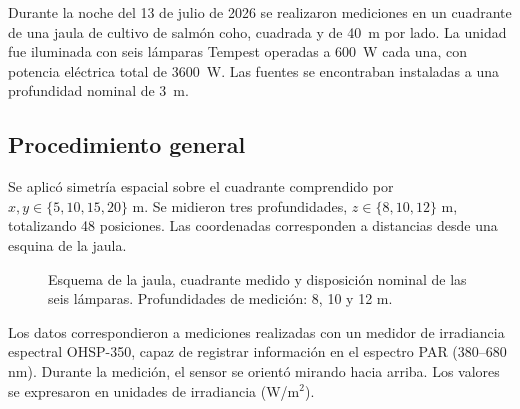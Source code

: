 \documentclass[11pt,letterpaper]{article}
\begin{document}
Durante la noche del 13 de julio de 2026 se realizaron mediciones en un cuadrante de una jaula de cultivo de salmón coho, cuadrada y de \SI{40}{\metre} por lado. La unidad fue iluminada con seis lámparas Tempest operadas a \SI{600}{\watt} cada una, con potencia eléctrica total de \SI{3600}{\watt}. Las fuentes se encontraban instaladas a una profundidad nominal de \SI{3}{\metre}.

\subsection{Procedimiento general}

Se aplicó simetría espacial sobre el cuadrante comprendido por $x,y\in\{5,10,15,20\}$ m. Se midieron tres profundidades, $z\in\{8,10,12\}$ m, totalizando 48 posiciones. Las coordenadas corresponden a distancias desde una esquina de la jaula.

\begin{figure}[H]
\centering
{}
\caption{Esquema de la jaula, cuadrante medido y disposición nominal de las seis lámparas. Profundidades de medición: 8, 10 y 12 m.}
\end{figure}

Los datos correspondieron a mediciones realizadas con un medidor de irradiancia espectral OHSP-350, capaz de registrar información en el espectro PAR (380--680 nm). Durante la medición, el sensor se orientó mirando hacia arriba. Los valores se expresaron en unidades de irradiancia (W/m$^2$).
\end{document}
